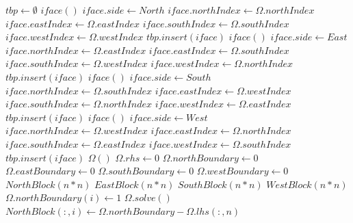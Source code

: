 \documentclass[12pt]{article}
\begin{document}
\begin{algorithmic}[1]
    \State $tbp \gets \emptyset$ 
            \State $iface()$ 
            \State $iface.side \gets North$
            \State $iface.northIndex \gets \Omega.northIndex$
            \State $iface.eastIndex \gets \Omega.eastIndex$
            \State $iface.southIndex \gets \Omega.southIndex$
            \State $iface.westIndex \gets \Omega.westIndex$
            \State $tbp.insert(iface)$
        \EndIf
            \State $iface()$ 
            \State $iface.side \gets East$
            \State $iface.northIndex \gets \Omega.eastIndex$
            \State $iface.eastIndex \gets \Omega.southIndex$
            \State $iface.southIndex \gets \Omega.westIndex$
            \State $iface.westIndex \gets \Omega.northIndex$
            \State $tbp.insert(iface)$
        \EndIf
            \State $iface()$ 
            \State $iface.side \gets South$
            \State $iface.northIndex \gets \Omega.southIndex$
            \State $iface.eastIndex \gets \Omega.westIndex$
            \State $iface.southIndex \gets \Omega.northIndex$
            \State $iface.westIndex \gets \Omega.eastIndex$
            \State $tbp.insert(iface)$
        \EndIf
            \State $iface()$ 
            \State $iface.side \gets West$
            \State $iface.northIndex \gets \Omega.westIndex$
            \State $iface.eastIndex \gets \Omega.northIndex$
            \State $iface.southIndex \gets \Omega.eastIndex$
            \State $iface.westIndex \gets \Omega.southIndex$
            \State $tbp.insert(iface)$
        \EndIf
    \EndFor
    \State $\Omega()$
    \State $\Omega.rhs \gets 0$
    \State $\Omega.northBoundary \gets 0$
    \State $\Omega.eastBoundary \gets 0$
    \State $\Omega.southBoundary \gets 0$
    \State $\Omega.westBoundary \gets 0$
    \State $NorthBlock(n*n)$ 
    \State $EastBlock(n*n)$
    \State $SouthBlock(n*n)$
    \State $WestBlock(n*n)$
         \State $\Omega.northBoundary(i) \gets 1$
         \State $\Omega.solve()$
         \State $NorthBlock(:,i) \gets \Omega.northBoundary-\Omega.lhs(:,n)$

\end{algorithmic}
\end{document}
